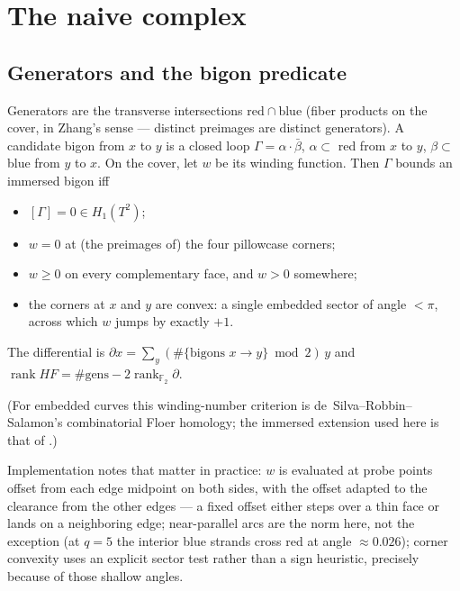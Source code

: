 \documentclass[11pt,reqno]{amsart}
\theoremstyle{plain}
\theoremstyle{definition}
\newcommand{\F}{\mathbb{F}}
\newcommand{\HF}{\mathit{HF}}
\newcommand{\rk}{\operatorname{rank}}
\begin{document}
\section{The naive complex}\label{sec:naive}

\subsection{Generators and the bigon predicate}
Generators are the transverse intersections $\mathrm{red}\cap\mathrm{blue}$ (fiber products on
the cover, in Zhang's sense --- distinct preimages are distinct generators). A candidate bigon
from $x$ to $y$ is a closed loop $\Gamma=\alpha\cdot\bar\beta$, $\alpha\subset$ red from $x$
to $y$, $\beta\subset$ blue from $y$ to $x$. On the cover, let $w$ be its winding function.
Then $\Gamma$ bounds an immersed bigon iff
\begin{itemize}
\item[(a)] $[\Gamma]=0\in H_1(T^2)$;
\item[(b)] $w=0$ at (the preimages of) the four pillowcase corners;
\item[(c)] $w\ge0$ on every complementary face, and $w>0$ somewhere;
\item[(d)] the corners at $x$ and $y$ are convex: a single embedded sector of angle $<\pi$,
across which $w$ jumps by exactly $+1$.
\end{itemize}
The differential is $\partial x=\sum_y(\#\{\text{bigons }x\to y\}\bmod2)\,y$ and
$\rk\HF=\#\text{gens}-2\rk_{\F_2}\partial$.

(For embedded curves this winding-number criterion is de~Silva--Robbin--Salamon's
combinatorial Floer homology; the immersed extension used here is that of \cite[\S4]{P2}.)

Implementation notes that matter in practice: $w$ is evaluated at
probe points offset from each edge midpoint on both sides, with the offset adapted to the
clearance from the other edges --- a fixed offset either steps over a thin face or lands on a
neighboring edge; near-parallel arcs are the norm here, not the exception (at $q=5$ the
interior blue strands cross red at angle $\approx0.026$); corner convexity uses an explicit
sector test rather than a sign heuristic, precisely because of those shallow angles.
\end{document}
